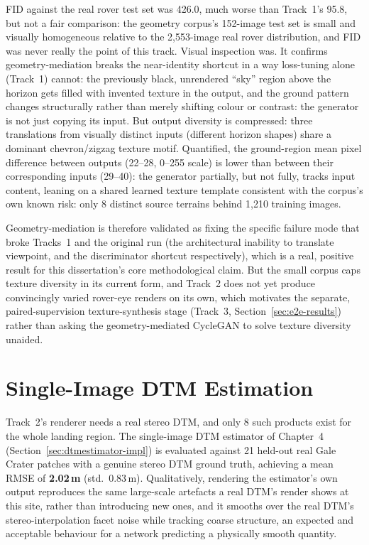 FID against the real rover test set was 426.0, much worse than Track~1's 95.8, but not a fair comparison: the geometry corpus's 152-image test set is small and visually homogeneous relative to the 2{,}553-image real rover distribution, and FID was never really the point of this track. Visual inspection was. It confirms geometry-mediation breaks the near-identity shortcut in a way loss-tuning alone (Track~1) cannot: the previously black, unrendered ``sky'' region above the horizon gets filled with invented texture in the output, and the ground pattern changes structurally rather than merely shifting colour or contrast: the generator is not just copying its input. But output diversity is compressed: three translations from visually distinct inputs (different horizon shapes) share a dominant chevron/zigzag texture motif. Quantified, the ground-region mean pixel difference between outputs (22--28, 0--255 scale) is lower than between their corresponding inputs (29--40): the generator partially, but not fully, tracks input content, leaning on a shared learned texture template consistent with the corpus's own known risk: only 8 distinct source terrains behind 1{,}210 training images.

Geometry-mediation is therefore validated as fixing the specific failure mode that broke Tracks~1 and the original run (the architectural inability to translate viewpoint, and the discriminator shortcut respectively), which is a real, positive result for this dissertation's core methodological claim. But the small corpus caps texture diversity in its current form, and Track~2 does not yet produce convincingly varied rover-eye renders on its own, which motivates the separate, paired-supervision texture-synthesis stage (Track~3, Section~\ref{sec:e2e-results}) rather than asking the geometry-mediated CycleGAN to solve texture diversity unaided.

\section{Single-Image DTM Estimation}
\label{sec:dtm-results}

Track~2's renderer needs a real stereo DTM, and only 8 such products exist for the whole landing region. The single-image DTM estimator of Chapter~4 (Section~\ref{sec:dtmestimator-impl}) is evaluated against 21 held-out real Gale Crater patches with a genuine stereo DTM ground truth, achieving a mean RMSE of \textbf{2.02\,m} (std.\ 0.83\,m). Qualitatively, rendering the estimator's own output reproduces the same large-scale artefacts a real DTM's render shows at this site, rather than introducing new ones, and it smooths over the real DTM's stereo-interpolation facet noise while tracking coarse structure, an expected and acceptable behaviour for a network predicting a physically smooth quantity.

